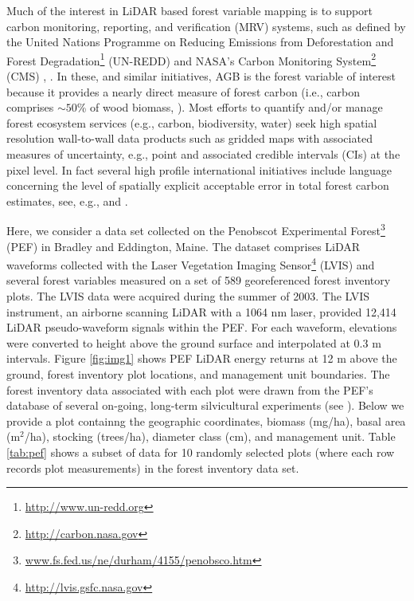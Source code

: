 \documentclass[]{krantz}
\renewcommand{\href}[2]{#2\footnote{\url{#1}}}
\theoremstyle{definition}
\theoremstyle{definition}
\theoremstyle{definition}
\theoremstyle{remark}
\begin{document}
Much of the interest in LiDAR based forest variable mapping is to
support carbon monitoring, reporting, and verification (MRV) systems,
such as defined by the United Nations Programme on
\href{http://www.un-redd.org}{Reducing Emissions from Deforestation and
Forest Degradation} (UN-REDD) and NASA's
\href{http://carbon.nasa.gov}{Carbon Monitoring System} (CMS)
\citep{le2011}, \citep{ometto2014}. In these, and similar initiatives,
AGB is the forest variable of interest because it provides a nearly
direct measure of forest carbon (i.e., carbon comprises \(\sim 50\)\% of
wood biomass, \citet{west2004}). Most efforts to quantify and/or manage
forest ecosystem services (e.g., carbon, biodiversity, water) seek high
spatial resolution wall-to-wall data products such as gridded maps with
associated measures of uncertainty, e.g., point and associated credible
intervals (CIs) at the pixel level. In fact several high profile
international initiatives include language concerning the level of
spatially explicit acceptable error in total forest carbon estimates,
see, e.g., \citet{REDD2009} and \citet{UNFCCC2015}.

Here, we consider a data set collected on the
\href{www.fs.fed.us/ne/durham/4155/penobsco.htm}{Penobscot Experimental
Forest} (PEF) in Bradley and Eddington, Maine. The dataset comprises
LiDAR waveforms collected with the
\href{http://lvis.gsfc.nasa.gov}{Laser Vegetation Imaging Sensor} (LVIS)
and several forest variables measured on a set of 589 georeferenced
forest inventory plots. The LVIS data were acquired during the summer of
2003. The LVIS instrument, an airborne scanning LiDAR with a 1064 nm
laser, provided 12,414 LiDAR pseudo-waveform signals within the PEF. For
each waveform, elevations were converted to height above the ground
surface and interpolated at 0.3 m intervals. Figure \ref{fig:img1} shows
PEF LiDAR energy returns at 12 m above the ground, forest inventory plot
locations, and management unit boundaries. The forest inventory data
associated with each plot were drawn from the PEF's database of several
on-going, long-term silvicultural experiments (see \citet{Kenefic2015}).
Below we provide a plot containng the geographic coordinates, biomass
(mg/ha), basal area (m\(^2\)/ha), stocking (trees/ha), diameter class
(cm), and management unit. Table \ref{tab:pef} shows a subset of data
for 10 randomly selected plots (where each row records plot
measurements) in the forest inventory data set.
\end{document}
